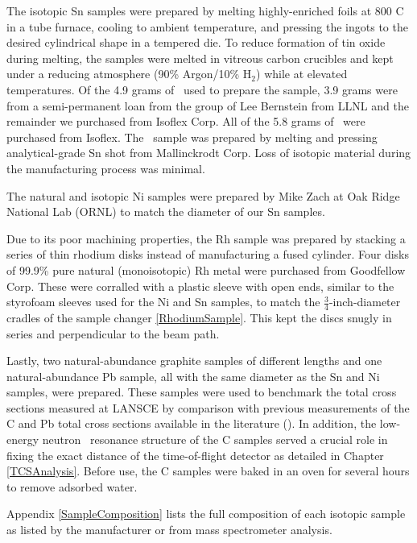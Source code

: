 The isotopic Sn samples were prepared by melting highly-enriched foils at 
800 C in a tube furnace, cooling to ambient temperature, and pressing the ingots
to the desired cylindrical shape in a tempered die. To reduce formation of tin
oxide during melting, the samples were melted in vitreous carbon crucibles
and kept under a reducing atmosphere (90\% Argon/10\% H$_{2}$) while at elevated
temperatures. Of the 4.9 grams of \snTwelve\ used to prepare the sample,
3.9 grams were from a semi-permanent loan from the group of Lee Bernstein from LLNL
and the remainder we purchased from Isoflex Corp. All of the 5.8 grams of \snFour\
were purchased from Isoflex. The \snNat\ sample was prepared by melting and
pressing analytical-grade Sn shot from Mallinckrodt Corp. Loss of isotopic
material during the manufacturing process was minimal.

The natural and isotopic Ni samples were prepared by Mike Zach at Oak Ridge
National Lab (ORNL) to match the diameter of our Sn samples.

Due to its poor machining properties, the Rh sample was prepared by
stacking a series of thin rhodium disks instead of manufacturing a
fused cylinder. Four disks of 99.9\% pure natural (monoisotopic) Rh metal were purchased from
Goodfellow Corp. These were corralled with a
plastic sleeve with open ends, similar to the styrofoam sleeves used for the Ni
and Sn samples, to match the $\frac{3}{4}$-inch-diameter cradles of the sample changer
\ref{RhodiumSample}.
This kept the discs snugly in series and perpendicular to the beam path.

Lastly, two natural-abundance graphite samples of different lengths and one
natural-abundance Pb sample, all with the same diameter as the Sn and Ni samples, were
prepared. These samples were used to benchmark the total cross sections
measured at LANSCE by comparison with previous measurements of the C and
Pb total cross sections available in the literature
(\cite{Finlay1993,Abfalterer2001}). In addition, the low-energy neutron \tot\ resonance
structure of the C samples served a crucial role in fixing the exact distance
of the time-of-flight detector as detailed in Chapter \ref{TCSAnalysis}.
Before use, the C samples were baked in an oven for several
hours to remove adsorbed water.

Appendix \ref{SampleComposition} lists the full composition of each isotopic
sample as listed by the manufacturer or from mass spectrometer analysis.

